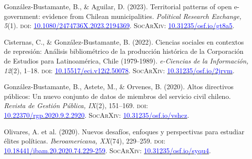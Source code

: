 \begin{publications}

\begin{benumerate}{10}

\item{\small González-Bustamante, B., \& Aguilar, D. (2023). Territorial patterns of open e-government: evidence from Chilean municipalities. {\itshape Political Research Exchange, 5}(1). {\scshape doi:} \href{https://doi.org/10.1080/2474736X.2023.2194369}{\textcolor{blue}{10.1080/2474736X.2023.2194369}}. {\scshape \footnotesize SocArXiv:} \href{https://doi.org/10.31235/osf.io/gt8a5}{\textcolor{blue}{10.31235/osf.io/gt8a5}}.}\vspace{1mm}

\item{\small Cisternas, C., \& González-Bustamante, B. (2022). Ciencias sociales en contextos de represión: Análisis bibliométrico de la producción histórica de la Corporación de Estudios para Latinoamérica, Chile (1979-1989). {\itshape e-Ciencias de la Información, 12}(2), 1--18. {\scshape doi:} \href{https://doi.org/10.15517/eci.v12i2.50078}{\textcolor{blue}{10.15517/eci.v12i2.50078}}. {\scshape \footnotesize SocArXiv:} \href{https://doi.org/10.31235/osf.io/2jrvm}{\textcolor{blue}{10.31235/osf.io/2jrvm}}.}\vspace{1mm} %

\item{\small González-Bustamante, B., Astete, M., \& Orvenes, B. (2020). Altos directivos públicos: Un nuevo conjunto de datos de miembros del servicio civil chileno. {\itshape Revista de Gestión Pública, IX}(2), 151--169. {\scshape doi}: \\ \href{https://doi.org/10.22370/rgp.2020.9.2.2920}{\textcolor{blue}{10.22370/rgp.2020.9.2.2920}}. {\scshape \footnotesize SocArXiv:} \href{https://doi.org/10.31235/osf.io/vshcz}{\textcolor{blue}{10.31235/osf.io/vshcz}}.}\vspace{1mm}

\item{\small Olivares, A. et al. (2020). Nuevos desafíos, enfoques y perspectivas para estudiar élites políticas. {\itshape Iberoamericana, XX}(74), 229--259. {\scshape doi}: \href{https://doi.org/10.18441/ibam.20.2020.74.229-259}{\textcolor{blue}{10.18441/ibam.20.2020.74.229-259}}. {\scshape \footnotesize SocArXiv:} \href{https://doi.org/10.31235/osf.io/syqu4}{\textcolor{blue}{10.31235/osf.io/syqu4}}.}\vspace{1mm}


\end{benumerate}
\end{publications}
